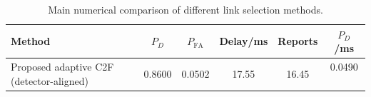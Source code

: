 \begin{table}[t]
    \centering
    \caption{Main numerical comparison of different link selection methods.}
    \label{tab:main_summary}
    \begin{tabular}{l c c c c c}
        \hline
        Method & $P_D$ & $P_{\mathrm{FA}}$ & Delay/ms & Reports & $P_D$/ms \\
        \hline
        Proposed adaptive C2F (detector-aligned) & 0.8600 & 0.0502 & 17.55 & 16.45 & 0.0490 \
        \hline
    \end{tabular}
\end{table}

